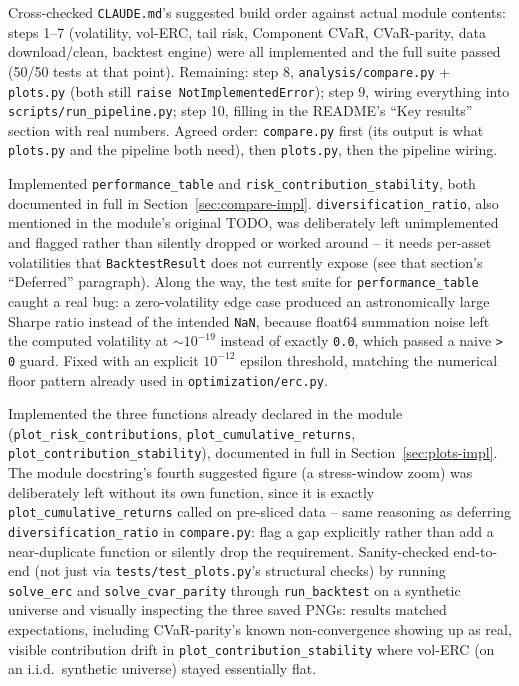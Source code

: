 \documentclass[11pt]{article}
\begin{document}
\begin{description}[style=nextline,leftmargin=0pt]
\item[Q: What are the next steps for the project?]
Cross-checked \texttt{CLAUDE.md}'s suggested build order against actual
module contents: steps 1--7 (volatility, vol-ERC, tail risk, Component
CVaR, CVaR-parity, data download/clean, backtest engine) were all
implemented and the full suite passed (50/50 tests at that point).
Remaining: step 8, \texttt{analysis/compare.py} + \texttt{plots.py}
(both still \texttt{raise NotImplementedError}); step 9, wiring
everything into \texttt{scripts/run\_pipeline.py}; step 10, filling in
the README's ``Key results'' section with real numbers. Agreed order:
\texttt{compare.py} first (its output is what \texttt{plots.py} and the
pipeline both need), then \texttt{plots.py}, then the pipeline wiring.

\item[Q: Start with \texttt{analysis/compare.py}.]
Implemented \texttt{performance\_table} and
\texttt{risk\_contribution\_stability}, both documented in full in
Section~\ref{sec:compare-impl}. \texttt{diversification\_ratio}, also
mentioned in the module's original TODO, was deliberately left
unimplemented and flagged rather than silently dropped or worked around
-- it needs per-asset volatilities that \texttt{BacktestResult} does
not currently expose (see that section's ``Deferred'' paragraph).
Along the way, the test suite for \texttt{performance\_table} caught a
real bug: a zero-volatility edge case produced an astronomically large
Sharpe ratio instead of the intended \texttt{NaN}, because float64
summation noise left the computed volatility at $\sim 10^{-19}$ instead
of exactly \texttt{0.0}, which passed a naive \texttt{> 0} guard. Fixed
with an explicit $10^{-12}$ epsilon threshold, matching the numerical
floor pattern already used in \texttt{optimization/erc.py}.

\item[Q: Now implement \texttt{analysis/plots.py}.]
Implemented the three functions already declared in the module
(\texttt{plot\_risk\_contributions}, \texttt{plot\_cumulative\_returns},
\texttt{plot\_contribution\_stability}), documented in full in
Section~\ref{sec:plots-impl}. The module docstring's fourth suggested
figure (a stress-window zoom) was deliberately left without its own
function, since it is exactly \texttt{plot\_cumulative\_returns} called
on pre-sliced data -- same reasoning as deferring
\texttt{diversification\_ratio} in \texttt{compare.py}: flag a gap
explicitly rather than add a near-duplicate function or silently drop
the requirement. Sanity-checked end-to-end (not just via
\texttt{tests/test\_plots.py}'s structural checks) by running
\texttt{solve\_erc} and \texttt{solve\_cvar\_parity} through
\texttt{run\_backtest} on a synthetic universe and visually inspecting
the three saved PNGs: results matched expectations, including
CVaR-parity's known non-convergence showing up as real, visible
contribution drift in \texttt{plot\_contribution\_stability} where
vol-ERC (on an i.i.d.\ synthetic universe) stayed essentially flat.

\end{description}
\end{document}
